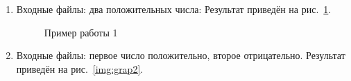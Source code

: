 \documentclass[12pt, a4paper]{article}
\begin{document}
\begin{enumerate}
	\item Входные файлы: два положительных числа:
	Результат приведён на рис.~\ref{img:grap1}.
	\begin{figure}[h]
  		\caption{Пример работы 1}
  		\label{img:grap1}
	\end{figure}
	\item Входные файлы: первое число положительно, второе отрицательно.
	Результат приведён на рис.~\ref{img:grap2}.
	\begin{figure}[h]

\end{figure}
\end{enumerate}
\end{document}

